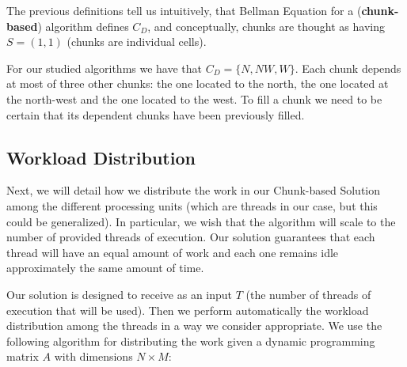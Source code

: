 \documentclass[journal]{IEEEtran}
\begin{document}
The previous definitions tell us intuitively, that Bellman Equation for a (\textbf{chunk-based}) algorithm defines $C_D$, and conceptually, chunks are thought as having $S = (1, 1)$ (chunks are individual cells).

For our studied algorithms we have that $C_D = \{N, NW, W\}$. Each chunk depends at most of three other chunks: the one located to the north, the one located at the north-west and the one located to the west. To fill a chunk we need to be certain that its dependent chunks have been previously filled.

\subsection{Workload Distribution}

Next, we will detail how we distribute the work in our Chunk-based Solution among the different processing units (which are threads in our case, but this could be generalized). In particular, we wish that the algorithm will scale to the number of provided threads of execution. Our solution guarantees that each thread will have an equal amount of work and each one remains idle approximately the same amount of time.

Our solution is designed to receive as an input $T$ (the number of threads of execution that will be used). Then we perform automatically the workload distribution among the threads in a way we consider appropriate. We use the following algorithm for distributing the work given a dynamic programming matrix $A$ with dimensions $N \times M$:
\end{document}
